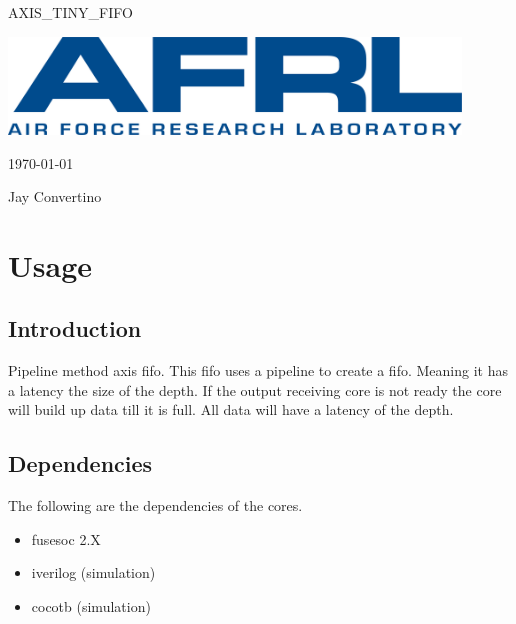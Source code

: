 \begin{titlepage}
  \begin{center}

  {\Huge AXIS\_TINY\_FIFO}

  \vspace{25mm}

  \includegraphics[width=0.90\textwidth,height=\textheight,keepaspectratio]{img/AFRL.png}

  \vspace{25mm}

  \today

  \vspace{15mm}

  {\Large Jay Convertino}

  \end{center}
\end{titlepage}

\tableofcontents

\newpage

\section{Usage}

\subsection{Introduction}

\par
Pipeline method axis fifo. This fifo uses a pipeline to create a fifo. Meaning
it has a latency the size of the depth. If the output receiving core is not ready
the core will build up data till it is full. All data will have a latency of the depth.

\subsection{Dependencies}

\par
The following are the dependencies of the cores.

\begin{itemize}
  \item fusesoc 2.X
  \item iverilog (simulation)
  \item cocotb (simulation)
\end{itemize}

